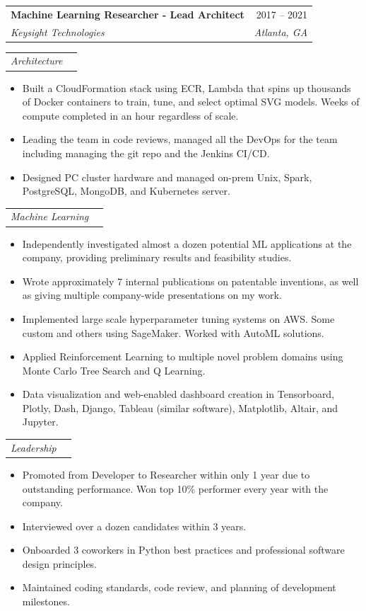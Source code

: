 \documentclass[letterpaper,11pt]{article}
\makeatletter
\newcommand{\resumeItem}[1]{
  \item\small{
    {#1 \vspace{-2pt}}
  }
}
\newcommand{\resumeSubheading}[4]{
  \vspace{-2pt}\item
    \begin{tabular*}{0.97\textwidth}[t]{l@{\extracolsep{\fill}}r}
      \textbf{#1} & #2 \\
      \textit{\small#3} & \textit{\small #4} \\
    \end{tabular*}\vspace{-7pt}
}
\newcommand{\resumeSubSubheading}[2]{
    \item
    \begin{tabular*}{0.97\textwidth}{l@{\extracolsep{\fill}}r}
      \textit{\small#1} & \textit{\small #2} \\
    \end{tabular*}\vspace{-7pt}
}
\newcommand{\resumeSubHeadingListEnd}{\end{itemize}}
\newcommand{\resumeItemListStart}{\begin{itemize}}
\newcommand{\resumeItemListEnd}{\end{itemize}\vspace{-5pt}}
\makeatother
\begin{document}
    \newpage

    \resumeSubheading
      {Machine Learning Researcher - Lead Architect}{2017 -- 2021}
      {Keysight Technologies}{Atlanta, GA}
      \resumeSubSubheading
      {Architecture}{}
      \resumeItemListStart
        \resumeItem{Built a CloudFormation stack using ECR, Lambda that spins up
          thousands of Docker containers to train, tune, and select optimal SVG models.
          Weeks of compute completed in an hour regardless of scale.}
        \resumeItem{Leading the team in code reviews, managed all the DevOps for
          the team including managing the git repo and the Jenkins CI/CD.}
        \resumeItem{Designed PC cluster hardware and managed on-prem Unix, Spark,
          PostgreSQL, MongoDB, and Kubernetes server.}
      \resumeItemListEnd
      \resumeSubSubheading
      {Machine Learning}{}
      \resumeItemListStart
        \resumeItem{Independently investigated almost a dozen potential ML
          applications at the company, providing preliminary results and
          feasibility studies.}
        \resumeItem{Wrote approximately 7 internal publications on patentable
          inventions, as well as giving multiple company-wide presentations on
          my work.}
        \resumeItem{Implemented large scale hyperparameter tuning systems on
          AWS\@. Some custom and others using SageMaker. Worked with AutoML solutions.}
        \resumeItem{Applied Reinforcement Learning to multiple novel problem
          domains using Monte Carlo Tree Search and Q Learning.}
        \resumeItem{Data visualization and web-enabled dashboard creation in Tensorboard,
          Plotly, Dash, Django, Tableau (similar software), Matplotlib, Altair, and Jupyter.}
      \resumeItemListEnd
      \resumeSubSubheading
      {Leadership}{}
      \resumeItemListStart
        \resumeItem{Promoted from Developer to Researcher within only 1 year
          due to outstanding performance. Won top 10\% performer
          every year with the company.}
        \resumeItem{Interviewed over a dozen candidates within 3 years.}
        \resumeItem{Onboarded 3 coworkers in Python best practices and
          professional software design principles.}
        \resumeItem{Maintained coding standards, code review, and planning of
          development milestones.}
      \resumeItemListEnd


\end{document}
